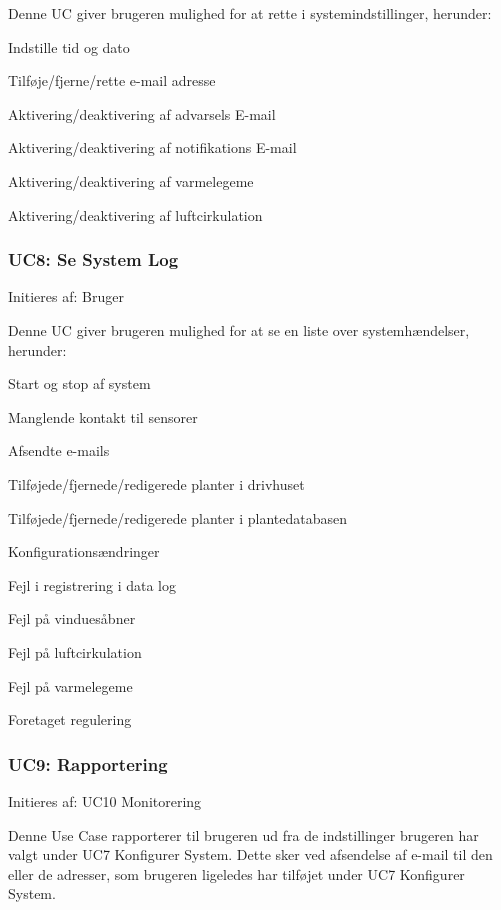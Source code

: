Denne UC giver brugeren mulighed for at rette i systemindstillinger, herunder:
\begin{packed_item}
\item Indstille tid og dato
\item Tilføje/fjerne/rette e-mail adresse 
\item Aktivering/deaktivering af advarsels E-mail
\item Aktivering/deaktivering af notifikations E-mail
\item Aktivering/deaktivering af varmelegeme
\item Aktivering/deaktivering af luftcirkulation
\end{packed_item}

\subsubsection{UC8: Se System Log}
Initieres af: Bruger

Denne UC giver brugeren mulighed for at se en liste over systemhændelser, herunder:
\begin{packed_item}
\item Start og stop af system
\item Manglende kontakt til sensorer
\item Afsendte e-mails
\item Tilføjede/fjernede/redigerede planter i drivhuset
\item Tilføjede/fjernede/redigerede planter i plantedatabasen
\item Konfigurationsændringer
\item Fejl i registrering i data log
\item Fejl på vinduesåbner
\item Fejl på luftcirkulation
\item Fejl på varmelegeme
\item Foretaget regulering
\end{packed_item}

\subsubsection{UC9: Rapportering}
Initieres af: UC10 Monitorering

Denne Use Case rapporterer til brugeren ud fra de indstillinger brugeren har valgt under UC7 Konfigurer System. 
Dette sker ved afsendelse af e-mail til den eller de adresser, som brugeren ligeledes har tilføjet under UC7 Konfigurer System.

